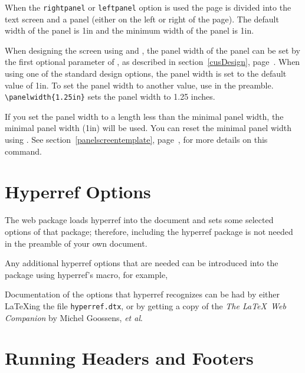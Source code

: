 \documentclass{article}
\begin{document}
When the \texttt{rightpanel} or \texttt{leftpanel} option is used
the page is divided into the text screen and a panel (either on the
left or right of the page).  The default width of the panel is 1in
and the minimum width of the panel is 1in.

When designing the screen using  and ,
the panel width of the panel can be set by the first optional
parameter of , as described in
section~\ref{cusDesign}, page~\pageref*{cusDesign}. When using one
of the standard design options, the panel width is set to the
default value of 1in. To set the panel width to another value, use
 in the preamble. \verb!\panelwidth{1.25in}! sets the
panel width to 1.25 inches.

If you set the panel width to a length less than the minimal panel
width, the minimal panel width (1in) will be used. You can reset the
minimal panel width using . See
section~\ref{panelscreentemplate},
page~\pageref*{panelscreentemplate}, for more details on this command.

\section{Hyperref Options}

The \textsf{web} package loads \textsf{hyperref} into the document
and sets some selected options of that package;  therefore,
including the \textsf{hyperref} package is not needed in the
preamble of your own document.

Any additional \textsf{hyperref} options that are needed can be
introduced into the package using \textsf{hyperref}'s
 macro, for example,

\noindent Documentation of the options that \textsf{hyperref}
recognizes can be had by either \LaTeX ing the file
\texttt{hyperref.dtx}, or by getting a copy of the \textsl{The
\LaTeX\ Web Companion} \cite{book:Goossens3} by Michel Goossens,
{\textsl{et al}}.

\section{Running Headers and Footers}
\end{document}
